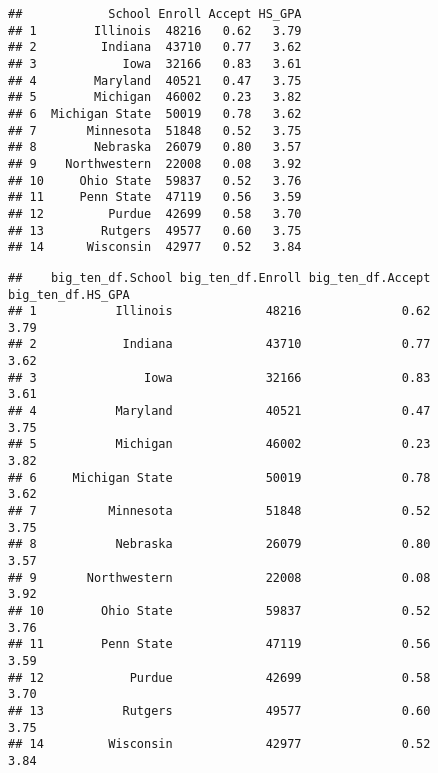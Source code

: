 \documentclass[
]{article}
\newenvironment{Shaded}{\begin{snugshade}}{\end{snugshade}}
\newcommand{\FunctionTok}[1]{\textcolor[rgb]{0.00,0.00,0.00}{#1}}
\newcommand{\NormalTok}[1]{#1}
\newcommand{\SpecialCharTok}[1]{\textcolor[rgb]{0.00,0.00,0.00}{#1}}
\begin{document}
\begin{verbatim}
##            School Enroll Accept HS_GPA
## 1        Illinois  48216   0.62   3.79
## 2         Indiana  43710   0.77   3.62
## 3            Iowa  32166   0.83   3.61
## 4        Maryland  40521   0.47   3.75
## 5        Michigan  46002   0.23   3.82
## 6  Michigan State  50019   0.78   3.62
## 7       Minnesota  51848   0.52   3.75
## 8        Nebraska  26079   0.80   3.57
## 9    Northwestern  22008   0.08   3.92
## 10     Ohio State  59837   0.52   3.76
## 11     Penn State  47119   0.56   3.59
## 12         Purdue  42699   0.58   3.70
## 13        Rutgers  49577   0.60   3.75
## 14      Wisconsin  42977   0.52   3.84
\end{verbatim}

\begin{Shaded}
\end{Shaded}

\begin{verbatim}
##    big_ten_df.School big_ten_df.Enroll big_ten_df.Accept big_ten_df.HS_GPA
## 1           Illinois             48216              0.62              3.79
## 2            Indiana             43710              0.77              3.62
## 3               Iowa             32166              0.83              3.61
## 4           Maryland             40521              0.47              3.75
## 5           Michigan             46002              0.23              3.82
## 6     Michigan State             50019              0.78              3.62
## 7          Minnesota             51848              0.52              3.75
## 8           Nebraska             26079              0.80              3.57
## 9       Northwestern             22008              0.08              3.92
## 10        Ohio State             59837              0.52              3.76
## 11        Penn State             47119              0.56              3.59
## 12            Purdue             42699              0.58              3.70
## 13           Rutgers             49577              0.60              3.75
## 14         Wisconsin             42977              0.52              3.84
\end{verbatim}
\end{document}
